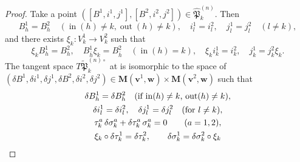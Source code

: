 \documentclass[12pt]{amsart}
\def\frak{\mathfrak}
\theoremstyle{definition}
\theoremstyle{remark}
\numberwithin{equation}{subsection}
\newcommand{\Hom}{\operatorname{Hom}}
\newcommand{\vin}{\operatorname{in}} %
\newcommand{\vout}{\operatorname{out}} %
\newcommand{\bM}{{\mathbf M}} %
\newcommand{\bv}{{\mathbf v}} %
\newcommand{\bw}{{\mathbf w}} %
\newcommand{\Pa}{{\frak P}} %
\begin{document}
\begin{proof}
Take a point
$([B^1,i^1,j^1],[B^2,i^2,j^2])\in\widehat\Pa_k^{(n)}$. Then
\begin{equation*}
   B^1_h = B^2_h \quad (\vin(h)\neq k, \vout(h)\neq k), \quad
   i^1_l = i^2_l, \quad j^1_l = j^2_l \quad(l\neq k),
\end{equation*}
and there exists $\xi_k\colon V_k^1\to V_k^2$ such that
\begin{equation*}
   \xi_k B^1_h = B^2_h, \quad B^1_{\overline h} \xi_k = B^2_{\overline h}
    \quad(\vin(h) = k),\quad
   \xi_k i^1_k = i^2_k, \quad
   j^1_k = j^2_k \xi_k.
\end{equation*}
The tangent space $T\widetilde\Pa_k^{(n)\circ}$ at is isomorphic to
the space of $(\delta B^1, \delta i^1, \delta j^1, \delta B^2, \delta
i^2, \delta j^2) \in \bM(\bv^1,\bw)\times\bM(\bv^2,\bw)$ such that
\begin{equation}
\label{eq:TP}
{\allowdisplaybreaks[4]
\begin{gathered}
   \delta B^1_h = \delta B^2_h
    \quad (\text{if $\vin(h)\neq k$, $\vout(h)\neq k$}), \\
    \delta i_l^1 = \delta i_l^2,\quad \delta j_l^1 = \delta j_l^2
    \quad (\text{for $l\neq k$}),\\
   \tau_k^a\, \delta\sigma_k^a + \delta\tau_k^a\, \sigma_k^a = 0
   \qquad(a=1,2),\\
    \xi_k\circ \delta\tau_k^1 = \delta\tau_k^2
   , \qquad
     \delta\sigma_k^1 = \delta\sigma_k^2\circ\xi_k
\end{gathered}
}
\end{equation}

\end{proof}
\end{document}
